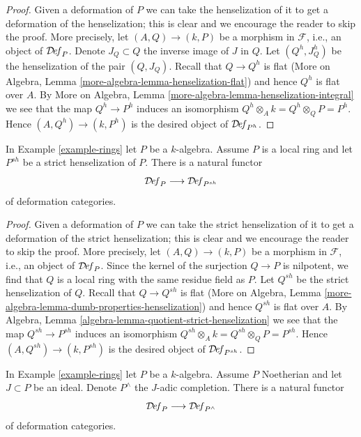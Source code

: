 \begin{proof}
Given a deformation of $P$ we can take the henselization
of it to get a deformation of the henselization; this is
clear and we encourage the reader to skip the proof. More precisely,
let $(A, Q) \to (k, P)$ be a morphism in $\mathcal{F}$, i.e.,
an object of $\mathcal{D}\!\mathit{ef}_P$. Denote $J_Q \subset Q$ the inverse
image of $J$ in $Q$. Let $(Q^h, J_Q^h)$ be the henselization of
the pair $(Q, J_Q)$. Recall that $Q \to Q^h$ is flat
(More on Algebra, Lemma \ref{more-algebra-lemma-henselization-flat})
and hence $Q^h$ is flat over $A$.
By More on Algebra, Lemma \ref{more-algebra-lemma-henselization-integral}
we see that the map $Q^h \to P^h$ induces an isomorphism
$Q^h \otimes_A k = Q^h \otimes_Q P = P^h$.
Hence $(A, Q^h) \to (k, P^h)$ is the desired object of
$\mathcal{D}\!\mathit{ef}_{P^h}$.
\end{proof}

\begin{lemma}
\label{lemma-strict-henselization}
In Example \ref{example-rings} let $P$ be a $k$-algebra.
Assume $P$ is a local ring and let $P^{sh}$ be a strict henselization of $P$.
There is a natural functor
$$
\mathcal{D}\!\mathit{ef}_P \longrightarrow \mathcal{D}\!\mathit{ef}_{P^{sh}}
$$
of deformation categories.
\end{lemma}

\begin{proof}
Given a deformation of $P$ we can take the strict henselization
of it to get a deformation of the strict henselization; this is
clear and we encourage the reader to skip the proof. More precisely,
let $(A, Q) \to (k, P)$ be a morphism in $\mathcal{F}$, i.e.,
an object of $\mathcal{D}\!\mathit{ef}_P$. Since the kernel of the surjection
$Q \to P$ is nilpotent, we find that $Q$ is a local ring with the
same residue field as $P$. Let $Q^{sh}$ be the strict henselization
of $Q$. Recall that $Q \to Q^{sh}$ is flat
(More on Algebra, Lemma \ref{more-algebra-lemma-dumb-properties-henselization})
and hence $Q^{sh}$ is flat over $A$.
By Algebra, Lemma \ref{algebra-lemma-quotient-strict-henselization}
we see that the map $Q^{sh} \to P^{sh}$ induces an isomorphism
$Q^{sh} \otimes_A k = Q^{sh} \otimes_Q P = P^{sh}$.
Hence $(A, Q^{sh}) \to (k, P^{sh})$ is the desired object of
$\mathcal{D}\!\mathit{ef}_{P^{sh}}$.
\end{proof}

\begin{lemma}
\label{lemma-completion}
In Example \ref{example-rings} let $P$ be a $k$-algebra.
Assume $P$ Noetherian and let $J \subset P$ be an ideal.
Denote $P^\wedge$ the $J$-adic completion.
There is a natural functor
$$
\mathcal{D}\!\mathit{ef}_P \longrightarrow \mathcal{D}\!\mathit{ef}_{P^\wedge}
$$
of deformation categories.
\end{lemma}

